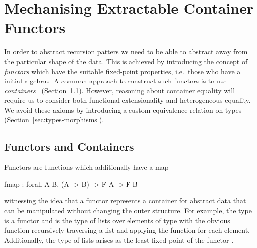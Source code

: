 \documentclass[ a4paper, UKenglish, cleveref, autoref, thm-restate]{lipics-v2021}
\newcommand{\R}{\mathbb{R}}
\newcommand{\operator}[1]{\textsf{#1}}
\begin{document}

\section{Mechanising Extractable Container Functors}
In order to abstract recursion patters we need to be able to abstract away from
the particular shape of the data.  This is achieved by introducing the concept
of \emph{functors} which have the suitable fixed-point properties, i.e.\ those
who have a initial algebras. A common approach to construct such functors is to
use \emph{containers}~\cite{AbbottAG05} (Section~\ref{sec:containers}).
However, reasoning about container equality will require us to consider both
functional extensionality and heterogeneous equality. We avoid these axioms by
introducing a custom equivalence relation on types
(Section~\ref{sec:types-morphisms}).

\subsection{Functors and Containers}
\label{sec:containers}
Functors are functions  which additionally have a
map
\begin{coqcode}
fmap : forall A B, (A -> B) -> F A -> F B
\end{coqcode}
witnessing the idea that a
functor represents a container for abstract data that can be manipulated without
changing the outer structure. For example, the type  is
a functor and  is the type of lists over elements of type 
with the obvious  function recursively traversing a list and applying
the function  for each element. Additionally, the type of
lists  arises as the least fixed-point of the
functor .
\end{document}
